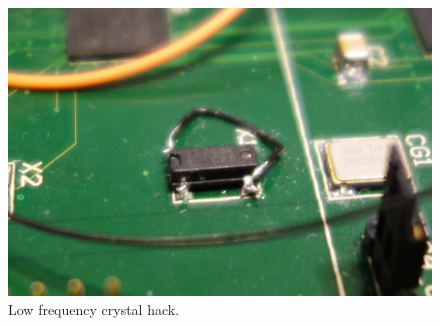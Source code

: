 \begin{figure}[H]
    \centering
    \includegraphics[scale=0.1]{figures/results/pcb/lfxtal}
    \caption{Low frequency crystal hack.}
    \label{fig:res:lfxtal}
\end{figure}

